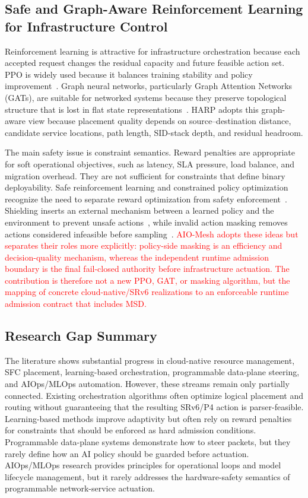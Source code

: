 \documentclass[final,5p]{elsarticle}
\newcommand{\rev}[1]{\textcolor{red}{#1}}
\begin{document}
\subsection{Safe and Graph-Aware Reinforcement Learning for Infrastructure Control}
\label{subsec:related_safe_rl}

Reinforcement learning is attractive for infrastructure orchestration because each accepted request changes the residual capacity and future feasible action set. PPO is widely used because it balances training stability and policy improvement~\cite{schulman2017proximal}. Graph neural networks, particularly Graph Attention Networks (GATs), are suitable for networked systems because they preserve topological structure that is lost in flat state representations~\cite{velickovic2018graph}. HARP adopts this graph-aware view because placement quality depends on source--destination distance, candidate service locations, path length, SID-stack depth, and residual headroom.

The main safety issue is constraint semantics. Reward penalties are appropriate for soft operational objectives, such as latency, SLA pressure, load balance, and migration overhead. They are not sufficient for constraints that define binary deployability. Safe reinforcement learning and constrained policy optimization recognize the need to separate reward optimization from safety enforcement~\cite{gu2024safe,ma2022conservative,wachi2024constraint}. Shielding inserts an external mechanism between a learned policy and the environment to prevent unsafe actions~\cite{alshiekh2018shielding}, while invalid action masking removes actions considered infeasible before sampling~\cite{huang2022closer}. \rev{AIO-Mesh adopts these ideas but separates their roles more explicitly: policy-side masking is an efficiency and decision-quality mechanism, whereas the independent runtime admission boundary is the final fail-closed authority before infrastructure actuation. The contribution is therefore not a new PPO, GAT, or masking algorithm, but the mapping of concrete cloud-native/SRv6 realizations to an enforceable runtime admission contract that includes MSD.}

\subsection{Research Gap Summary}
\label{subsec:related_gap}
\sloppy
The literature shows substantial progress in cloud-native resource management, SFC placement, learning-based orchestration, programmable data-plane steering, and AIOps/MLOps automation. However, these streams remain only partially connected. Existing orchestration algorithms often optimize logical placement and routing without guaranteeing that the resulting SRv6/P4 action is parser-feasible. Learning-based methods improve adaptivity but often rely on reward penalties for constraints that should be enforced as hard admission conditions. Programmable data-plane systems demonstrate how to steer packets, but they rarely define how an AI policy should be guarded before actuation. AIOps/MLOps research provides principles for operational loops and model lifecycle management, but it rarely addresses the hardware-safety semantics of programmable network-service actuation.
\end{document}
